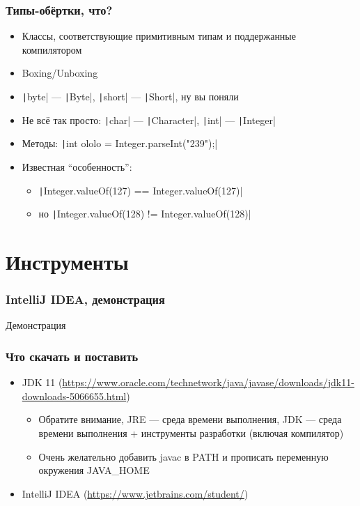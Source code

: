 \documentclass[xetex,mathserif,serif]{beamer}
\begin{document}
	\begin{frame}
		\frametitle{Типы-обёртки, что?}
		\begin{itemize}
			\item Классы, соответствующие примитивным типам и поддержанные компилятором
			\item Boxing/Unboxing
			\item \texttt|byte| --- \texttt|Byte|, \texttt|short| --- \texttt|Short|, ну вы поняли
			\item Не всё так просто: \texttt|char| --- \texttt|Character|, \texttt|int| --- \texttt|Integer|
			\item Методы: \texttt|int ololo = Integer.parseInt("239");|
			\item Известная ``особенность'':
			\begin{itemize}
				\item \texttt|Integer.valueOf(127) == Integer.valueOf(127)|
				\item но \texttt|Integer.valueOf(128) != Integer.valueOf(128)|
			\end{itemize}
		\end{itemize}
	\end{frame}

	\section{Инструменты}

	\begin{frame}
		\frametitle{IntelliJ IDEA, демонстрация}
		\begin{center}
			\huge{Демонстрация}
		\end{center}
	\end{frame}

	\begin{frame}
		\frametitle{Что скачать и поставить}
		\begin{itemize}
			\item JDK 11 (\url{https://www.oracle.com/technetwork/java/javase/downloads/jdk11-downloads-5066655.html})
			\begin{itemize}
				\item Обратите внимание, JRE --- среда времени выполнения, JDK --- среда времени выполнения + инструменты разработки (включая компилятор)
				\item Очень желательно добавить javac в PATH и прописать переменную окружения JAVA\_HOME
			\end{itemize}
			\item IntelliJ IDEA (\url{https://www.jetbrains.com/student/})
		\end{itemize}
	\end{frame}
\end{document}
